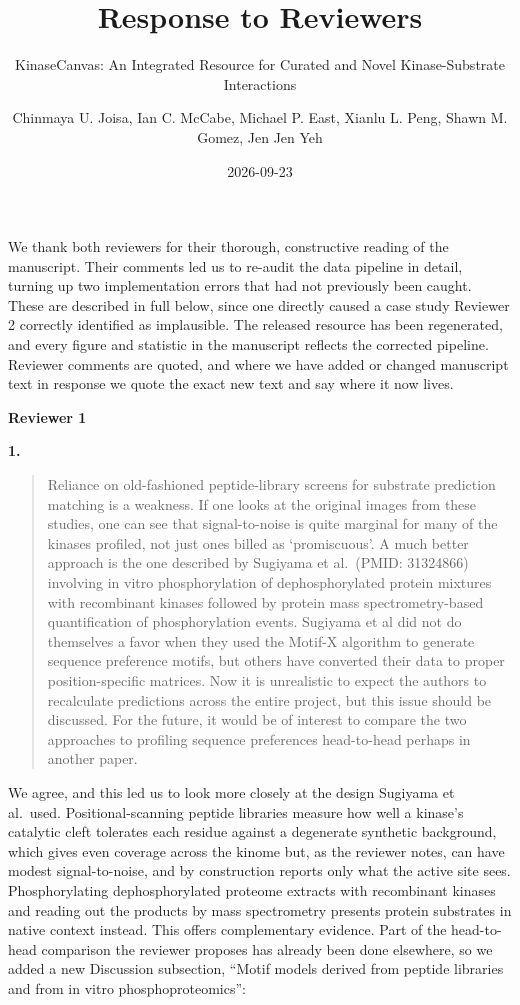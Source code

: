 \documentclass[
]{article}
\title{Response to Reviewers}
\subtitle{KinaseCanvas: An Integrated Resource for Curated and Novel
Kinase-Substrate Interactions}
\author{Chinmaya U. Joisa, Ian C. McCabe, Michael P. East, Xianlu L.
Peng, Shawn M. Gomez, Jen Jen Yeh}
\date{2026-09-23}
\begin{document}
\maketitle


We thank both reviewers for their thorough, constructive reading of the
manuscript. Their comments led us to re-audit the data pipeline in
detail, turning up two implementation errors that had not previously
been caught. These are described in full below, since one directly
caused a case study Reviewer 2 correctly identified as implausible. The
released resource has been regenerated, and every figure and statistic
in the manuscript reflects the corrected pipeline. Reviewer comments are
quoted, and where we have added or changed manuscript text in response
we quote the exact new text and say where it now lives.

\textbf{Reviewer 1}

\textbf{1.}

\begin{quote}
Reliance on old-fashioned peptide-library screens for substrate
prediction matching is a weakness. If one looks at the original images
from these studies, one can see that signal-to-noise is quite marginal
for many of the kinases profiled, not just ones billed as `promiscuous'.
A much better approach is the one described by Sugiyama et al.~(PMID:
31324866) involving in vitro phosphorylation of dephosphorylated protein
mixtures with recombinant kinases followed by protein mass
spectrometry-based quantification of phosphorylation events. Sugiyama et
al did not do themselves a favor when they used the Motif-X algorithm to
generate sequence preference motifs, but others have converted their
data to proper position-specific matrices. Now it is unrealistic to
expect the authors to recalculate predictions across the entire project,
but this issue should be discussed. For the future, it would be of
interest to compare the two approaches to profiling sequence preferences
head-to-head perhaps in another paper.
\end{quote}

We agree, and this led us to look more closely at the design Sugiyama et
al.~used. Positional-scanning peptide libraries measure how well a
kinase's catalytic cleft tolerates each residue against a degenerate
synthetic background, which gives even coverage across the kinome but,
as the reviewer notes, can have modest signal-to-noise, and by
construction reports only what the active site sees. Phosphorylating
dephosphorylated proteome extracts with recombinant kinases and reading
out the products by mass spectrometry presents protein substrates in
native context instead. This offers complementary evidence. Part of the
head-to-head comparison the reviewer proposes has already been done
elsewhere, so we added a new Discussion subsection, ``Motif models
derived from peptide libraries and from in vitro phosphoproteomics'':
\end{document}
